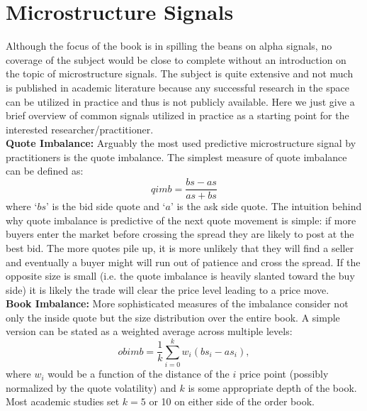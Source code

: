 \section{Microstructure Signals }

Although the focus of the book is in spilling the beans on alpha signals, no coverage of the subject would be close to complete without an introduction on the topic of microstructure signals. The subject is quite extensive and not much is published in academic literature because any successful research in the space can be utilized in practice and thus is not publicly available. Here we just give a brief overview of common signals utilized in practice as a starting point for the interested researcher/practitioner. \\


\noindent\textbf{Quote Imbalance:} Arguably the most used predictive microstructure signal by practitioners is the quote imbalance.  The simplest measure of quote imbalance can be defined as: 
	\begin{equation}\label{eq:q_imb}
		qimb = \frac{bs - as}{as + bs}
	\end{equation}
where `$bs$' is the bid side quote and `$a$' is the ask side quote. The intuition behind why quote imbalance is predictive of the next quote movement is simple: if more buyers enter the market before crossing the spread they are likely to post at the best bid. The more quotes pile up, it is more unlikely that they will find a seller and eventually a buyer might will run out of patience and cross the spread. If the opposite size is small (i.e. the quote imbalance is heavily slanted toward the buy side) it is likely the trade will clear the price level leading to a price move. \\


\noindent\textbf{Book Imbalance:} More sophisticated measures of the imbalance consider not only the inside quote but the size distribution over the entire book. A simple version can be stated as a weighted average across multiple levels:
	\begin{equation}\label{eq:microprc}
		obimb = \frac{1}{k}\sum_{i=0}^k w_i (bs_i-  as_i),
	\end{equation}
where $w_i$ would be a function of the distance of the $i$ price point (possibly normalized by the quote volatility) and $k$ is some appropriate depth of the book. Most academic studies set $k=5$ or 10 on either side of the order book. \\


